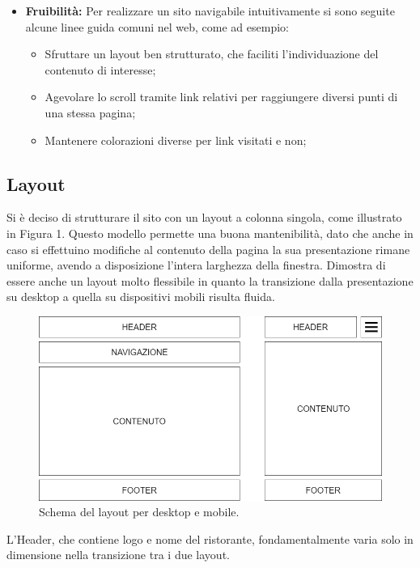 \documentclass{article}
\begin{document}
\begin{itemize}
		        \item \textbf{Fruibilità:}
		        Per realizzare un sito navigabile intuitivamente si sono seguite alcune linee guida comuni nel web, come ad esempio:
		        \begin{itemize}
		            \item Sfruttare un layout ben strutturato, che faciliti l'individuazione del contenuto di interesse;
		            \item Agevolare lo scroll tramite link relativi per raggiungere diversi punti di una stessa pagina;
		            \item Mantenere colorazioni diverse per link visitati e non;
		        \end{itemize}
		    \end{itemize}
		\subsection{Layout}
			Si è deciso di strutturare il sito con un layout a colonna singola, come illustrato in Figura 1. Questo modello permette una buona mantenibilità, dato che anche in caso si effettuino modifiche al contenuto della pagina la sua presentazione rimane uniforme, avendo a disposizione l'intera larghezza della finestra. 
		    Dimostra di essere anche un layout molto flessibile in quanto la transizione dalla presentazione su desktop a quella su dispositivi mobili risulta fluida.
		    \begin{figure}[http] %
		        \centering
		        \includegraphics[width=\textwidth]{schema_layout.png}
		        \caption{Schema del layout per desktop e mobile.}
		        \label{fig:layout}
		    \end{figure}
		    \bigbreak
		    L'Header, che contiene logo e nome del ristorante, fondamentalmente varia solo in dimensione nella transizione tra i due layout.
\end{document}
